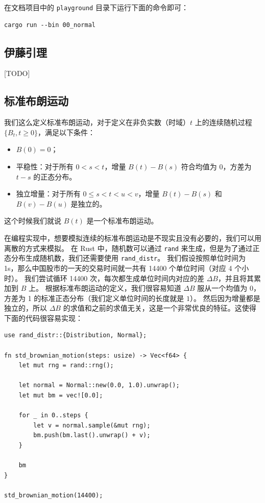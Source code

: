 \documentclass[utf8,a4paper,nofonts,9pt]{ctexbook}
\begin{document}
在文档项目中的 \verb|playground| 目录下运行下面的命令即可：

\begin{lstlisting}
cargo run --bin 00_normal
\end{lstlisting}

\subsection{伊藤引理}
\label{title:ItosLemma}

[TODO]

\subsection{标准布朗运动}

我们这么定义标准布朗运动，对于定义在非负实数（时域）$t$ 上的连续随机过程 $\{B_t, t \ge 0\}$，满足以下条件：

\begin{itemize}
    \item $B(0) = 0$；
    \item 平稳性：对于所有 $0 < s < t$，增量 $B(t) - B(s)$ 符合均值为 $0$，方差为 $t - s$ 的正态分布。
    \item 独立增量：对于所有 $0 \le s < t < u < v$，增量 $B(t) - B(s)$ 和 $B(v) - B(u)$ 是独立的。
\end{itemize}

这个时候我们就说 $B(t)$ 是一个标准布朗运动。

在编程实现中，想要模拟连续的标准布朗运动是不现实且没有必要的，我们可以用离散的方式来模拟。
在 Rust 中，随机数可以通过 \verb|rand| 来生成，但是为了通过正态分布生成随机数，我们还需要使用 \verb|rand_distr|。
我们假设按照单位时间为 1s，那么中国股市的一天的交易时间就一共有 14400 个单位时间（对应 4 个小时）。
我们尝试循环 14400 次，每次都生成单位时间内对应的差 $\Delta B$，并且将其累加到 $B$ 上。
根据标准布朗运动的定义，我们很容易知道 $\Delta B$ 服从一个均值为 0，方差为 1 的标准正态分布（我们定义单位时间的长度就是 $1$）。
然后因为增量都是独立的，所以 $\Delta B$ 的求值和之前的求值无关，这是一个非常优良的特征。这使得下面的代码很容易实现：

\begin{lstlisting}
use rand_distr::{Distribution, Normal};

fn std_brownian_motion(steps: usize) -> Vec<f64> {
    let mut rng = rand::rng();

    let normal = Normal::new(0.0, 1.0).unwrap();
    let mut bm = vec![0.0];

    for _ in 0..steps {
        let v = normal.sample(&mut rng);
        bm.push(bm.last().unwrap() + v);
    }

    bm
}

std_brownian_motion(14400);
\end{lstlisting}
\end{document}
